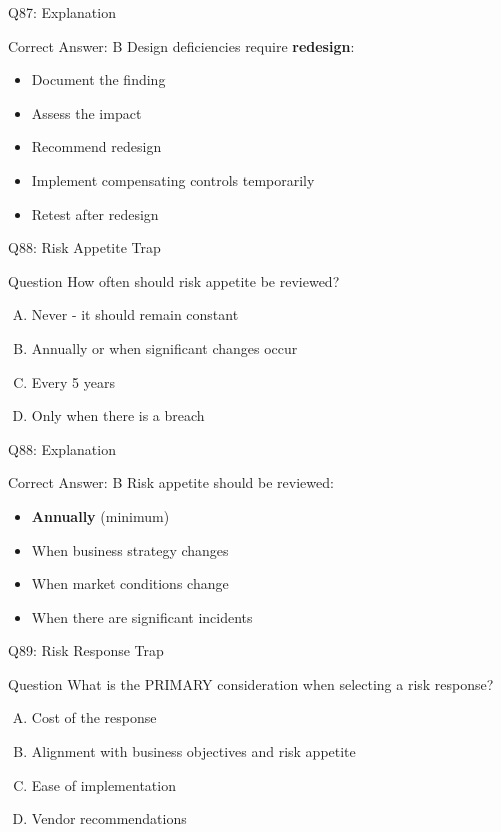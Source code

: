 \documentclass{beamer}
\begin{document}
	\begin{frame}{Q87: Explanation}
		\begin{block}{Correct Answer: B}
			Design deficiencies require \textbf{redesign}:
			\begin{itemize}
				\item Document the finding
				\item Assess the impact
				\item Recommend redesign
				\item Implement compensating controls temporarily
				\item Retest after redesign
			\end{itemize}
		\end{block}
	\end{frame}
	
	\begin{frame}{Q88: Risk Appetite Trap}
		\begin{block}{Question}
			How often should risk appetite be reviewed?
		\end{block}
		\begin{enumerate}[(A)]
			\item Never - it should remain constant
			\item Annually or when significant changes occur
			\item Every 5 years
			\item Only when there is a breach
		\end{enumerate}
	\end{frame}
	
	\begin{frame}{Q88: Explanation}
		\begin{block}{Correct Answer: B}
			Risk appetite should be reviewed:
			\begin{itemize}
				\item \textbf{Annually} (minimum)
				\item When business strategy changes
				\item When market conditions change
				\item When there are significant incidents
			\end{itemize}
		\end{block}
	\end{frame}
	
	\begin{frame}{Q89: Risk Response Trap}
		\begin{block}{Question}
			What is the PRIMARY consideration when selecting a risk response?
		\end{block}
		\begin{enumerate}[(A)]
			\item Cost of the response
			\item Alignment with business objectives and risk appetite
			\item Ease of implementation
			\item Vendor recommendations
		\end{enumerate}
	\end{frame}
	
\end{document}

